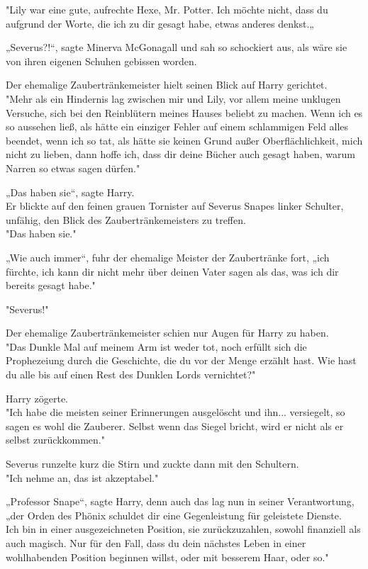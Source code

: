 {"Lily war eine gute, aufrechte Hexe, Mr. Potter. Ich möchte nicht, dass du aufgrund der Worte, die ich zu dir gesagt habe, etwas anderes denkst.„

„Severus?!“, sagte Minerva McGonagall und sah so schockiert aus, als wäre sie von ihren eigenen Schuhen gebissen worden.

Der ehemalige Zaubertränkemeister hielt seinen Blick auf Harry gerichtet.\\ "Mehr als ein Hindernis lag zwischen mir und Lily, vor allem meine unklugen Versuche, sich bei den Reinblütern meines Hauses beliebt zu machen. Wenn ich es so aussehen ließ, als hätte ein einziger Fehler auf einem schlammigen Feld alles beendet, wenn ich so tat, als hätte sie keinen Grund außer Oberflächlichkeit, mich nicht zu lieben, dann hoffe ich, dass dir deine Bücher auch gesagt haben, warum Narren so etwas sagen dürfen."

„Das haben sie“, sagte Harry.\\ Er blickte auf den feinen grauen Tornister auf Severus Snapes linker Schulter, unfähig, den Blick des Zaubertränkemeisters zu treffen.\\ "Das haben sie."

„Wie auch immer“, fuhr der ehemalige Meister der Zaubertränke fort, „ich fürchte, ich kann dir nicht mehr über deinen Vater sagen als das, was ich dir bereits gesagt habe."

"Severus!"

Der ehemalige Zaubertränkemeister schien nur Augen für Harry zu haben.\\ "Das Dunkle Mal auf meinem Arm ist weder tot, noch erfüllt sich die Prophezeiung durch die Geschichte, die du vor der Menge erzählt hast. Wie hast du alle bis auf einen Rest des Dunklen Lords vernichtet?"

Harry zögerte.\\ "Ich habe die meisten seiner Erinnerungen ausgelöscht und ihn... versiegelt, so sagen es wohl die Zauberer. Selbst wenn das Siegel bricht, wird er nicht als er selbst zurückkommen."

Severus runzelte kurz die Stirn und zuckte dann mit den Schultern.\\ "Ich nehme an, das ist akzeptabel."

„Professor Snape“, sagte Harry, denn auch das lag nun in seiner Verantwortung, „der Orden des Phönix schuldet dir eine Gegenleistung für geleistete Dienste.\\ Ich bin in einer ausgezeichneten Position, sie zurückzuzahlen, sowohl finanziell als auch magisch. Nur für den Fall, dass du dein nächstes Leben in einer wohlhabenden Position beginnen willst, oder mit besserem Haar, oder so."

}
